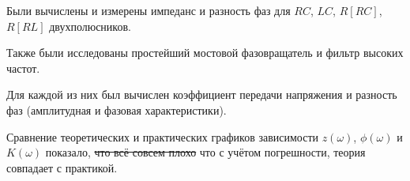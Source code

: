 Были вычислены и измерены импеданс и разность фаз для $RC$, $LC$, $R[RC]$, $R[RL]$ двухполюсников.
 

Также были исследованы простейший мостовой фазовращатель и фильтр высоких частот.

Для каждой из них был вычислен коэффициент передачи напряжения и разность фаз (амплитудная и фазовая характеристики). 
 
Сравнение теоретических и практических графиков зависимости $z(\omega)$, $\phi(\omega)$ и $K(\omega)$
показало, \sout{что всё совсем плохо} что с учётом погрешности, теория совпадает с практикой.


